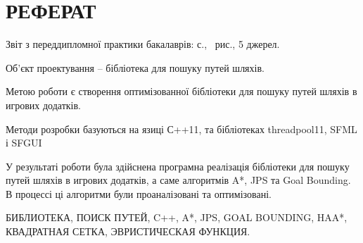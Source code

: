 \section*{РЕФЕРАТ}

\vspace{1\baselineskip}

\thispagestyle{empty}

Звіт з переддипломної практики бакалаврів: \pageref{LastPage} с., \totalfigures\ рис., 5 джерел.

Об'єкт проектування -- бібліотека для пошуку путей шляхів.

Метою роботи є створення оптимізованної бібліотеки для пошуку путей шляхів в игрових додатків.

Методи розробки базуються на язиці С++11, та бібліотеках threadpool11, SFML і SFGUI

У результаті роботи була здійснена програмна реалізація бібліотеки для пошуку путей шляхів в игрових додатків, а саме алгоритмів A*, JPS та Goal Bounding. В процессі ці алгоритми були проаналізовані та оптимізовані.

БИБЛИОТЕКА, ПОИСК ПУТЕЙ, C++, A*, JPS, GOAL BOUNDING, HAA*, КВАДРАТНАЯ СЕТКА, ЭВРИСТИЧЕСКАЯ ФУНКЦИЯ.